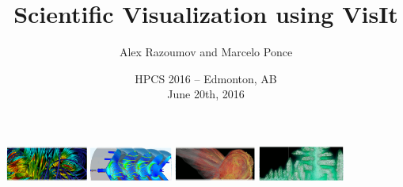 \documentclass[xcolor=svgnames]{beamer}
\begin{document}
\title[VisIt Workshop]{\Large\bf Scientific Visualization using VisIt}
\author[\textbf{A.Razoumov} \& \textbf{M.Ponce}]{\Large {\sc Alex Razoumov} and {\sc Marcelo Ponce}}
\date[HPCS 2016]{HPCS 2016 -- Edmonton, AB \\ June 20th, 2016}

\begin{frame}
  \centering
\href{https://wci.llnl.gov/simulation/computer-codes/visit/}{\includegraphics[height=1.15cm]{./figs/visit-logos/VisIt-01}} \href{https://wci.llnl.gov/simulation/computer-codes/visit/}{\includegraphics[height=1.15cm]{./figs/visit-logos/VisIt-02}} \href{https://wci.llnl.gov/simulation/computer-codes/visit/}{\includegraphics[height=1.15cm]{./figs/visit-logos/VisIt-03}} \href{https://wci.llnl.gov/simulation/computer-codes/visit/}{\includegraphics[height=1.15cm]{./figs/visit-logos/VisIt-04}}

  \vspace{-.25cm}

  \titlepage
\end{frame}
\end{document}
